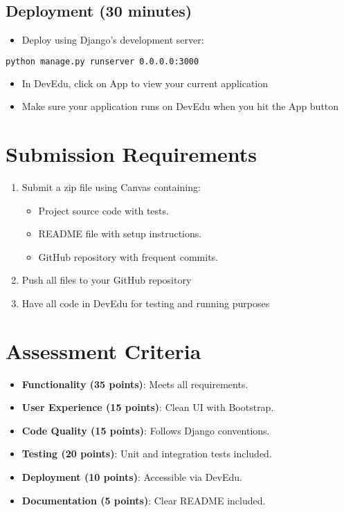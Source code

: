 \documentclass{article}
\begin{document}
\subsection{Deployment (30 minutes)}
\begin{itemize}
    \item Deploy using Django's development server:
\end{itemize}
\begin{lstlisting}[style=customcode,language=bash]
python manage.py runserver 0.0.0.0:3000
\end{lstlisting}

\begin{itemize}
    \item In DevEdu, click on App to view your current application
    \item Make sure your application runs on DevEdu when you hit the App button
\end{itemize}

\section{Submission Requirements}
\begin{enumerate}
    \item Submit a zip file using Canvas containing:
    \begin{itemize}
        \item Project source code with tests.
        \item README file with setup instructions.
        \item GitHub repository with frequent commits.
\end{itemize}
    \item Push all files to your GitHub repository
    \item Have all code in DevEdu for testing and running purposes
\end{enumerate}

\section{Assessment Criteria}
\begin{itemize}
    \item \textbf{Functionality (35 points)}: Meets all requirements.
    \item \textbf{User Experience (15 points)}: Clean UI with Bootstrap.
    \item \textbf{Code Quality (15 points)}: Follows Django conventions.
    \item \textbf{Testing (20 points)}: Unit and integration tests included.
    \item \textbf{Deployment (10 points)}: Accessible via DevEdu.
    \item \textbf{Documentation (5 points)}: Clear README included.
\end{itemize}
\newpage 
\end{document}
